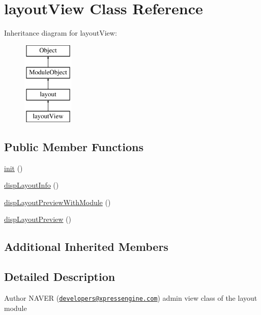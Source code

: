 \hypertarget{classlayoutView}{\section{layout\-View Class Reference}
\label{classlayoutView}
}
Inheritance diagram for layout\-View\-:\begin{figure}[H]
\begin{center}
\leavevmode
\includegraphics[height=4.000000cm]{classlayoutView}
\end{center}
\end{figure}
\subsection*{Public Member Functions}
\begin{DoxyCompactItemize}
\item 
\hyperlink{classlayoutView_ad61f59b8dd10b1b97ebfdcf7d9c230da}{init} ()
\item 
\hyperlink{classlayoutView_a7e82f54644ad872c39e708449b6fea29}{disp\-Layout\-Info} ()
\item 
\hyperlink{classlayoutView_a9d6c6bcdcf6ce58534d2f49f3fb89fce}{disp\-Layout\-Preview\-With\-Module} ()
\item 
\hyperlink{classlayoutView_ae61b21bdcf9e655ac2d1dab95ba96519}{disp\-Layout\-Preview} ()
\end{DoxyCompactItemize}
\subsection*{Additional Inherited Members}


\subsection{Detailed Description}
\begin{DoxyAuthor}{Author}
N\-A\-V\-E\-R (\href{mailto:developers@xpressengine.com}{\tt developers@xpressengine.\-com}) admin view class of the layout module 
\end{DoxyAuthor}



